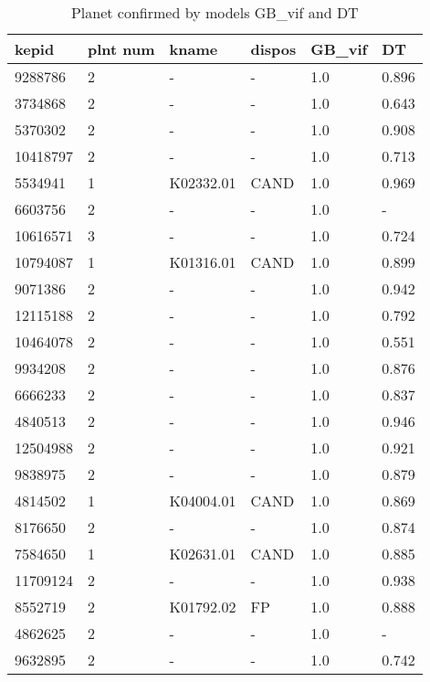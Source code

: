 \begin{table}[!htbp]
 \centering
 \caption{Planet confirmed by models GB\_vif and DT}
 \label{dataGBvifDTcreftab} 
  \begin{tabular}
{| 
 p{}| 
 p{}| 
 p{}| 
 p{}| 
 p{}| 
 p{}| 
}\hline 
\textbf{kepid} &\textbf{plnt num} &\textbf{kname} &\textbf{dispos} &\textbf{GB\_vif} &\textbf{DT} \\ \hline 
9288786 &2 &- &- &1.0 &0.896 \\ \hline 
3734868 &2 &- &- &1.0 &0.643 \\ \hline 
5370302 &2 &- &- &1.0 &0.908 \\ \hline 
10418797 &2 &- &- &1.0 &0.713 \\ \hline 
5534941 &1 &K02332.01 &CAND &1.0 &0.969 \\ \hline 
6603756 &2 &- &- &1.0 &- \\ \hline 
10616571 &3 &- &- &1.0 &0.724 \\ \hline 
10794087 &1 &K01316.01 &CAND &1.0 &0.899 \\ \hline 
9071386 &2 &- &- &1.0 &0.942 \\ \hline 
12115188 &2 &- &- &1.0 &0.792 \\ \hline 
10464078 &2 &- &- &1.0 &0.551 \\ \hline 
9934208 &2 &- &- &1.0 &0.876 \\ \hline 
6666233 &2 &- &- &1.0 &0.837 \\ \hline 
4840513 &2 &- &- &1.0 &0.946 \\ \hline 
12504988 &2 &- &- &1.0 &0.921 \\ \hline 
9838975 &2 &- &- &1.0 &0.879 \\ \hline 
4814502 &1 &K04004.01 &CAND &1.0 &0.869 \\ \hline 
8176650 &2 &- &- &1.0 &0.874 \\ \hline 
7584650 &1 &K02631.01 &CAND &1.0 &0.885 \\ \hline 
11709124 &2 &- &- &1.0 &0.938 \\ \hline 
8552719 &2 &K01792.02 &FP &1.0 &0.888 \\ \hline 
4862625 &2 &- &- &1.0 &- \\ \hline 
9632895 &2 &- &- &1.0 &0.742 \\ \hline 

\end{tabular}
\end{table}
